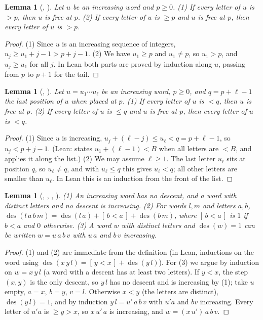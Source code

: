 \documentclass[11pt]{amsart}
\theoremstyle{plain}
\newtheorem{lemma}[theorem]{Lemma}
\theoremstyle{definition}
\newcommand{\des}{\operatorname{des}}
\begin{document}
\begin{lemma}[, ]\label{lem:lower}
Let $u$ be an increasing word and $p\ge0$. \textup{(1)} If every letter of $u$ is $>p$, then $u$ is free at $p$. \textup{(2)} If every letter of $u$ is $\ge p$ and $u$ is free at $p$, then every letter of $u$ is $>p$.
\end{lemma}

\begin{proof}
(1) Since $u$ is an increasing sequence of integers, $u_j\ge u_1+j-1>p+j-1$. (2) We have $u_1\ge p$ and $u_1\ne p$, so $u_1>p$, and $u_j\ge u_1$ for all $j$. In Lean both parts are proved by induction along $u$, passing from $p$ to $p+1$ for the tail.
\end{proof}

\begin{lemma}[, ]\label{lem:upper}
Let $u=u_1\cdots u_\ell$ be an increasing word, $p\ge0$, and $q=p+\ell-1$ the last position of $u$ when placed at $p$. \textup{(1)} If every letter of $u$ is $<q$, then $u$ is free at $p$. \textup{(2)} If every letter of $u$ is $\le q$ and $u$ is free at $p$, then every letter of $u$ is $<q$.
\end{lemma}

\begin{proof}
(1) Since $u$ is increasing, $u_j+(\ell-j)\le u_\ell<q=p+\ell-1$, so $u_j<p+j-1$. (Lean:  states $u_1+(\ell-1)<B$ when all letters are $<B$, and  applies it along the list.) (2) We may assume $\ell\ge1$. The last letter $u_\ell$ sits at position $q$, so $u_\ell\ne q$, and with $u_\ell\le q$ this gives $u_\ell<q$; all other letters are smaller than $u_\ell$. In Lean this is an induction from the front of the list.
\end{proof}

\begin{lemma}[, , , ]\label{lem:des}
\textup{(1)} An increasing word has no descent, and a word with distinct letters and no descent is increasing. \textup{(2)} For words $l,m$ and letters $a,b$, $\des(l\,a\,b\,m)=\des(l\,a)+[\,b<a\,]+\des(b\,m)$, where $[\,b<a\,]$ is $1$ if $b<a$ and $0$ otherwise. \textup{(3)} A word $w$ with distinct letters and $\des(w)=1$ can be written $w=u\,a\,b\,v$ with $u\,a$ and $b\,v$ increasing.
\end{lemma}

\begin{proof}
(1) and (2) are immediate from the definition (in Lean, inductions on the word using $\des(x\,y\,l)=[\,y<x\,]+\des(y\,l)$). For (3) we argue by induction on $w=x\,y\,l$ (a word with a descent has at least two letters). If $y<x$, the step $(x,y)$ is the only descent, so $y\,l$ has no descent and is increasing by (1); take $u$ empty, $a=x$, $b=y$, $v=l$. Otherwise $x<y$ (the letters are distinct), $\des(y\,l)=1$, and by induction $y\,l=u'\,a\,b\,v$ with $u'a$ and $bv$ increasing. Every letter of $u'a$ is $\ge y>x$, so $x\,u'\,a$ is increasing, and $w=(x\,u')\,a\,b\,v$.
\end{proof}
\end{document}

